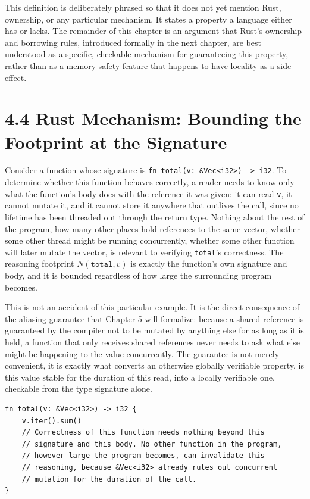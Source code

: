 \documentclass[11pt]{book}
\begin{document}
This definition is deliberately phrased so that it does not yet mention Rust, ownership, or any particular mechanism. It states a property a language either has or lacks. The remainder of this chapter is an argument that Rust's ownership and borrowing rules, introduced formally in the next chapter, are best understood as a specific, checkable mechanism for guaranteeing this property, rather than as a memory-safety feature that happens to have locality as a side effect.

\section*{4.4 Rust Mechanism: Bounding the Footprint at the Signature}

Consider a function whose signature is \texttt{fn total(v: \&Vec<i32>) -> i32}. To determine whether this function behaves correctly, a reader needs to know only what the function's body does with the reference it was given: it can read \texttt{v}, it cannot mutate it, and it cannot store it anywhere that outlives the call, since no lifetime has been threaded out through the return type. Nothing about the rest of the program, how many other places hold references to the same vector, whether some other thread might be running concurrently, whether some other function will later mutate the vector, is relevant to verifying \texttt{total}'s correctness. The reasoning footprint $N(\texttt{total}, v)$ is exactly the function's own signature and body, and it is bounded regardless of how large the surrounding program becomes.

This is not an accident of this particular example. It is the direct consequence of the aliasing guarantee that Chapter 5 will formalize: because a shared reference is guaranteed by the compiler not to be mutated by anything else for as long as it is held, a function that only receives shared references never needs to ask what else might be happening to the value concurrently. The guarantee is not merely convenient, it is exactly what converts an otherwise globally verifiable property, is this value stable for the duration of this read, into a locally verifiable one, checkable from the type signature alone.

\begin{lstlisting}
fn total(v: &Vec<i32>) -> i32 {
    v.iter().sum()
    // Correctness of this function needs nothing beyond this
    // signature and this body. No other function in the program,
    // however large the program becomes, can invalidate this
    // reasoning, because &Vec<i32> already rules out concurrent
    // mutation for the duration of the call.
}
\end{lstlisting}
\end{document}
